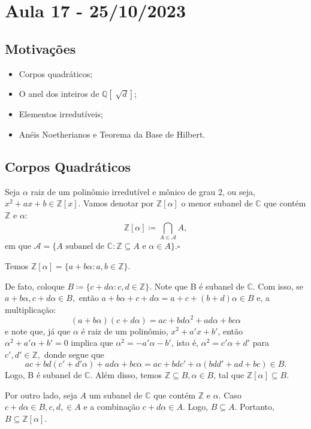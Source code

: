 \documentclass[algebraII_notes.tex]{subfiles}
\begin{document}
\section{Aula 17 - 25/10/2023}
\subsection{Motivações}
\begin{itemize}
	\item Corpos quadráticos;
	\item O anel dos inteiros de \(\mathbb{Q}[\sqrt[]{d}]\);
	\item Elementos irredutíveis;
	\item Anéis Noetherianos e Teorema da Base de Hilbert.
\end{itemize}
\subsection{Corpos Quadráticos}
\begin{def*}
	Seja \(\alpha \) raiz de um polinômio irredutível e mônico de grau 2, ou seja, \(x^{2}+ax+b\in \mathbb{Z}[x].\) Vamos denotar
	por \(\mathbb{Z}[\alpha ]\) o menor subanel de \(\mathbb{C}\) que contém \(\mathbb{Z}\) e \(\alpha \):
	\[
		\mathbb{Z}[\alpha ]\coloneqq \bigcap_{A\in \mathcal{A}}^{}{A},
	\]
	em que \(\mathcal{A} = \{A\text{ subanel de }\mathbb{C}: \mathbb{Z}\subseteq{A}\text{ e }\alpha \in A\}. \square\)
\end{def*}
\begin{prop*}
	Temos \(\mathbb{Z}[\alpha ] = \{a + b\alpha : a, b\in \mathbb{Z}\}.\)
\end{prop*}
\begin{proof*}
	De fato, coloque \(B\coloneqq \{c+d\alpha : c, d\in \mathbb{Z}\}.\) Note que B é subanel de \(\mathbb{C}\).
	Com isso, se \(a + b\alpha , c + d\alpha \in B,\) então \(a + b\alpha + c +d\alpha = a + c + (b+d)\alpha \in B\)
	e, a multiplicação:
	\[
		(a+b\alpha )(c+d\alpha ) = ac + bd\alpha^{2} + ad\alpha + bc\alpha
	\]
	e note que, já que \(\alpha \) é raiz de um polinômio, \(x^{2} + a'x + b'\), então \(\alpha ^{2} + a'\alpha  + b' = 0\) implica
	que \(\alpha^{2} = -a'\alpha  - b'\), isto é, \(\alpha^{2} = c'\alpha + d'\) para \(c', d'\in \mathbb{Z},\) donde segue que
	\[
		ac + bd(c'+d'\alpha ) + ad\alpha + bc\alpha = ac + bdc' + \alpha(bdd'+ad+bc)\in B.
	\]
	Logo, B é subanel de \(\mathbb{C}.\) Além disso, temos \(\mathbb{Z}\subseteq{B}, \alpha \in B\), tal que
	\(\mathbb{Z}[\alpha ]\subseteq{B}.\)

	Por outro lado, seja \(A\) um subanel de \(\mathbb{C}\) que contém \(\mathbb{Z}\) e \(\alpha .\) Caso \(c+d\alpha \in B, c, d,\in A\)
	e a combinação \(c+d\alpha \in A\). Logo, \(B \subseteq{A}.\) Portanto, \(B\subseteq{\mathbb{Z}[\alpha ]}\). \qedsymbol
\end{proof*}
\end{document}
